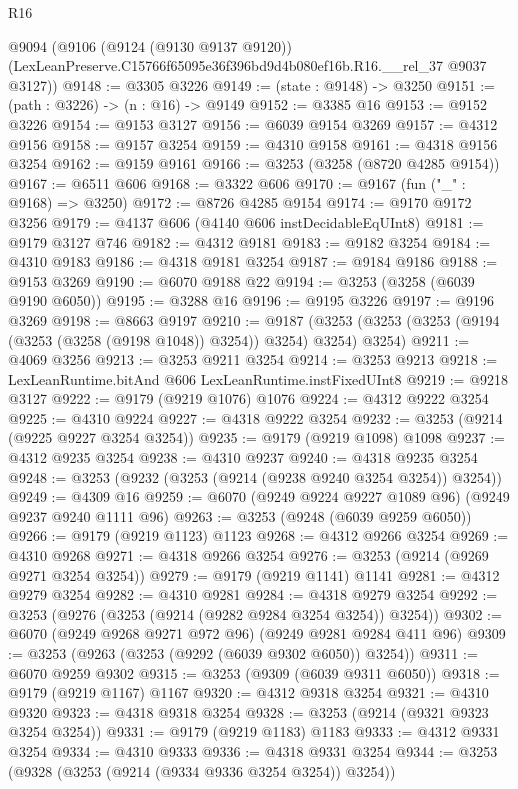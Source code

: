 \begin{lexlean}{R16}
\begin{coremodule}
  @9094
    (@9106
      (@9124 (@9130 @9137 @9120))
      (LexLeanPreserve.C15766f65095e36f396bd9d4b080ef16b.R16.__rel_37 @9037 @3127))
@9148 := @3305 @3226
@9149 := (state : @9148) -> @3250
@9151 := (path : @3226) -> (n : @16) -> @9149
@9152 := @3385 @16
@9153 := @9152 @3226
@9154 := @9153 @3127
@9156 := @6039 @9154 @3269
@9157 := @4312 @9156
@9158 := @9157 @3254
@9159 := @4310 @9158
@9161 := @4318 @9156 @3254
@9162 := @9159 @9161
@9166 := @3253 (@3258 (@8720 @4285 @9154))
@9167 := @6511 @606
@9168 := @3322 @606
@9170 := @9167 (fun ("_" : @9168) => @3250)
@9172 := @8726 @4285 @9154
@9174 := @9170 @9172 @3256
@9179 := @4137 @606 (@4140 @606 instDecidableEqUInt8)
@9181 := @9179 @3127 @746
@9182 := @4312 @9181
@9183 := @9182 @3254
@9184 := @4310 @9183
@9186 := @4318 @9181 @3254
@9187 := @9184 @9186
@9188 := @9153 @3269
@9190 := @6070 @9188 @22
@9194 := @3253 (@3258 (@6039 @9190 @6050))
@9195 := @3288 @16
@9196 := @9195 @3226
@9197 := @9196 @3269
@9198 := @8663 @9197
@9210 := @9187 (@3253 (@3253 (@3253 (@9194 (@3253 (@3258 (@9198 @1048)) @3254)) @3254) @3254) @3254)
@9211 := @4069 @3256
@9213 := @3253 @9211 @3254
@9214 := @3253 @9213
@9218 := LexLeanRuntime.bitAnd @606 LexLeanRuntime.instFixedUInt8
@9219 := @9218 @3127
@9222 := @9179 (@9219 @1076) @1076
@9224 := @4312 @9222 @3254
@9225 := @4310 @9224
@9227 := @4318 @9222 @3254
@9232 := @3253 (@9214 (@9225 @9227 @3254 @3254))
@9235 := @9179 (@9219 @1098) @1098
@9237 := @4312 @9235 @3254
@9238 := @4310 @9237
@9240 := @4318 @9235 @3254
@9248 := @3253 (@9232 (@3253 (@9214 (@9238 @9240 @3254 @3254)) @3254))
@9249 := @4309 @16
@9259 := @6070 (@9249 @9224 @9227 @1089 @96) (@9249 @9237 @9240 @1111 @96)
@9263 := @3253 (@9248 (@6039 @9259 @6050))
@9266 := @9179 (@9219 @1123) @1123
@9268 := @4312 @9266 @3254
@9269 := @4310 @9268
@9271 := @4318 @9266 @3254
@9276 := @3253 (@9214 (@9269 @9271 @3254 @3254))
@9279 := @9179 (@9219 @1141) @1141
@9281 := @4312 @9279 @3254
@9282 := @4310 @9281
@9284 := @4318 @9279 @3254
@9292 := @3253 (@9276 (@3253 (@9214 (@9282 @9284 @3254 @3254)) @3254))
@9302 := @6070 (@9249 @9268 @9271 @972 @96) (@9249 @9281 @9284 @411 @96)
@9309 := @3253 (@9263 (@3253 (@9292 (@6039 @9302 @6050)) @3254))
@9311 := @6070 @9259 @9302
@9315 := @3253 (@9309 (@6039 @9311 @6050))
@9318 := @9179 (@9219 @1167) @1167
@9320 := @4312 @9318 @3254
@9321 := @4310 @9320
@9323 := @4318 @9318 @3254
@9328 := @3253 (@9214 (@9321 @9323 @3254 @3254))
@9331 := @9179 (@9219 @1183) @1183
@9333 := @4312 @9331 @3254
@9334 := @4310 @9333
@9336 := @4318 @9331 @3254
@9344 := @3253 (@9328 (@3253 (@9214 (@9334 @9336 @3254 @3254)) @3254))

\end{coremodule}
\end{lexlean}
